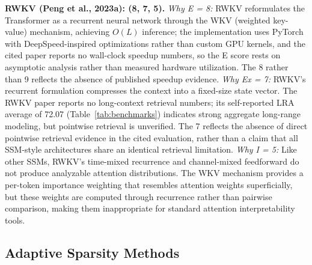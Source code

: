 \documentclass[10pt,twocolumn]{article}
\begin{document}
\textbf{RWKV (Peng et al., 2023a): (8, 7, 5).}
\textit{Why E = 8:} RWKV reformulates the Transformer as a recurrent neural network through the WKV (weighted key-value) mechanism, achieving $O(L)$ inference; the implementation uses PyTorch with DeepSpeed-inspired optimizations rather than custom GPU kernels, and the cited paper reports no wall-clock speedup numbers, so the E score rests on asymptotic analysis rather than measured hardware utilization. The 8 rather than 9 reflects the absence of published speedup evidence. \textit{Why Ex = 7:} RWKV's recurrent formulation compresses the context into a fixed-size state vector. The RWKV paper reports no long-context retrieval numbers; its self-reported LRA average of 72.07 (Table~\ref{tab:benchmarks}) indicates strong aggregate long-range modeling, but pointwise retrieval is unverified. The 7 reflects the absence of direct pointwise retrieval evidence in the cited evaluation, rather than a claim that all SSM-style architectures share an identical retrieval limitation. \textit{Why I = 5:} Like other SSMs, RWKV's time-mixed recurrence and channel-mixed feedforward do not produce analyzable attention distributions. The WKV mechanism provides a per-token importance weighting that resembles attention weights superficially, but these weights are computed through recurrence rather than pairwise comparison, making them inappropriate for standard attention interpretability tools.

\subsection*{Adaptive Sparsity Methods}
\end{document}
